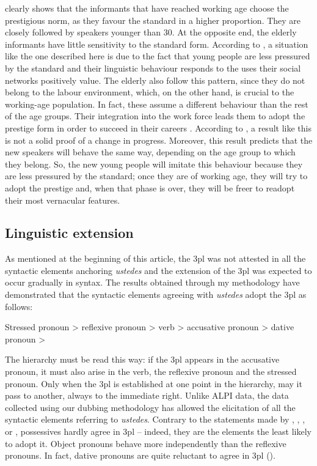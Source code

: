 \documentclass[output=paper]{LSP/langsci}
\begin{document}
 clearly shows that the informants that have reached working age choose the prestigious norm, as they favour the standard in a higher proportion. They are closely followed by speakers younger than 30. At the opposite end, the elderly informants have little sensitivity to the standard form. According to \citet{chambers_dialectology_1980}, a situation like the one described here is due to the fact that young people are less pressured by the standard and their linguistic behaviour responds to the uses their social networks positively value. The elderly also follow this pattern, since they do not belong to the labour environment, which, on the other hand, is crucial to the working-age population. In fact, these assume a different behaviour than the rest of the age groups. Their integration into the work force leads them to adopt the prestige form in order to succeed in their careers \citep{macaulay_language_1977,bourdieu_mercado_1978,seara_variacao_2000}. According to \citet{chambers_dialectology_1980}, a result like this is not a solid proof of a change in progress. Moreover, this result predicts that the new speakers will behave the same way, depending on the age group to which they belong. So, the new young people will imitate this behaviour because they are less pressured by the standard; once they are of working age, they will try to adopt the prestige and, when that phase is over, they will be freer to readopt their most vernacular features.

\subsection{Linguistic extension}
As mentioned at the beginning of this article, the 3pl was not attested in all the syntactic elements anchoring \textit{ustedes} and the extension of the 3pl was expected to occur gradually in syntax. The results obtained through my methodology have demonstrated that the syntactic elements agreeing with \textit{ustedes} adopt the 3pl as follows:

\begin{exe}
\ex Stressed pronoun {\textgreater} reflexive pronoun {\textgreater} verb {\textgreater} accusative pronoun {\textgreater} dative pronoun {\textgreater}
\end{exe}

The hierarchy must be read this way: if the 3pl appears in the accusative pronoun, it must also arise in the verb, the reflexive pronoun and the stressed pronoun. Only when the 3pl is established at one point in the hierarchy, may it pass to another, always to the immediate right. Unlike ALPI data, the data collected using our dubbing methodology has allowed the elicitation of all the syntactic elements referring to \textit{ustedes}. Contrary to the statements made by \citet{mondejar_verbo_1974}, \citet{lapesa_estudios_2000}, \citet{cano_historia_2004}, \citet{penny_variacion_2004} or \citet{menendez_pidal_historia_2005}, possessives hardly agree in 3pl – indeed, they are the elements the least likely to adopt it. Object pronouns behave more independently than the reflexive pronouns. In fact, dative pronouns are quite reluctant to agree in 3pl ().  
\end{document}
